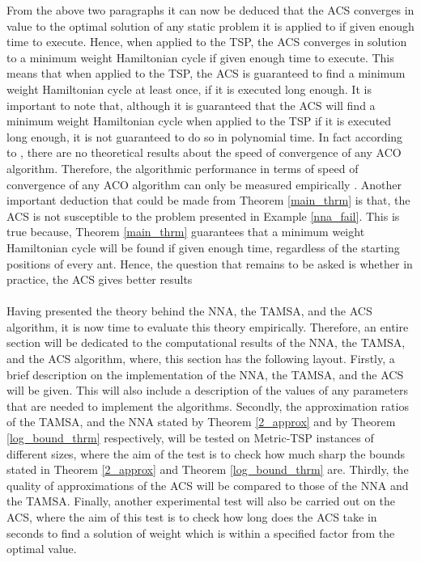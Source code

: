 \documentclass{article}
\begin{document}
From the above two paragraphs it can now be deduced that the ACS converges in value to the optimal solution of any static problem it is applied to if given enough time to execute. Hence, when applied to the TSP, the ACS converges in solution to a minimum weight Hamiltonian cycle if given enough time to execute. This means that when applied to the TSP, the ACS is guaranteed to find a minimum weight Hamiltonian cycle at least once, if it is executed long enough. It is important to note that, although it is guaranteed that the ACS will find a minimum weight Hamiltonian cycle when applied to the TSP if it is executed long enough, it is not guaranteed to do so in polynomial time. In fact according to \cite{dorigo_stutzle_thomas_2004}, there are no theoretical results about the speed of convergence of any ACO algorithm. Therefore, the algorithmic performance in terms of speed of convergence of any ACO algorithm can only be measured empirically \cite{dorigo_stutzle_thomas_2004}. Another important deduction that could be made from Theorem \ref{main_thrm} is that, the ACS is not susceptible to the problem presented in Example \ref{nna_fail}. This is true because, Theorem \ref{main_thrm} guarantees that a minimum weight Hamiltonian cycle will be found if given enough time, regardless of the starting positions of every ant. Hence, the question that remains to be asked is whether in practice, the ACS gives better results \\\\
Having presented the theory behind the NNA, the TAMSA, and the ACS algorithm, it is now time to evaluate this theory empirically. Therefore, an entire section will be dedicated to the computational results of the NNA, the TAMSA, and the ACS algorithm, where, this section has the following layout. Firstly, a brief description on the implementation of the NNA, the TAMSA, and the ACS will be given. This will also include a description of the values of any parameters that are needed to implement the algorithms. Secondly, the approximation ratios of the TAMSA, and the NNA stated by Theorem \ref{2_approx} and by Theorem \ref{log_bound_thrm} respectively, will be tested on Metric-TSP instances of different sizes, where the aim of the test is to check how much sharp the bounds stated in Theorem \ref{2_approx} and Theorem \ref{log_bound_thrm} are. Thirdly, the quality of approximations of the ACS will be compared to those of the NNA and the TAMSA. Finally, another experimental test will also be carried out on the ACS, where the aim of this test is to check how long does the ACS take in seconds to find a solution of weight which is within a specified factor from the optimal value.
\newpage
\end{document}
